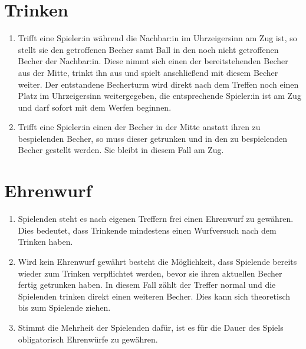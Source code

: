 \section{Trinken}
\begin{enumerate}[label={(\arabic*)}]
    \item
    Trifft eine Spieler:in während die Nachbar:in im Uhrzeigersinn am Zug ist, so stellt sie den getroffenen Becher samt Ball in den noch nicht getroffenen Becher der Nachbar:in.
    Diese nimmt sich einen der bereitstehenden Becher aus der Mitte, trinkt ihn aus und spielt anschließend mit diesem Becher weiter.
    Der entstandene Becherturm wird direkt nach dem Treffen noch einen Platz im Uhrzeigersinn weitergegeben, die entsprechende Spieler:in ist am Zug und darf sofort mit dem Werfen beginnen.

    \item
    Trifft eine Spieler:in einen der Becher in der Mitte anstatt ihren zu bespielenden Becher, so muss dieser getrunken und in den zu bespielenden Becher gestellt werden.
    Sie bleibt in diesem Fall am Zug.
\end{enumerate}

\section{Ehrenwurf}
\begin{enumerate}[label={(\arabic*)}]
    \item
    Spielenden steht es nach eigenen Treffern frei einen \glqq{}Ehrenwurf\grqq{} zu gewähren.
    Dies bedeutet, dass Trinkende mindestens einen Wurfversuch nach dem Trinken haben.

    \item
    Wird kein Ehrenwurf gewährt besteht die Möglichkeit, dass Spielende bereits wieder zum Trinken verpflichtet werden, bevor sie ihren aktuellen Becher fertig getrunken haben.
    In diesem Fall zählt der Treffer normal und die Spielenden trinken direkt einen weiteren Becher.
    Dies kann sich theoretisch bis zum Spielende ziehen.

    \item
    Stimmt die Mehrheit der Spielenden dafür, ist es für die Dauer des Spiels obligatorisch Ehrenwürfe zu gewähren.
\end{enumerate}
